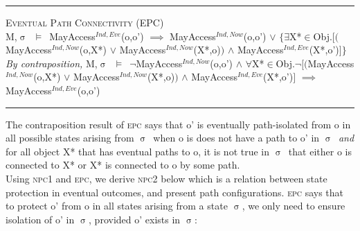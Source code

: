 \documentclass[a4paper,11pt, twoside,twocolumn]{article}
\newenvironment{logic}[1][null]
{\begin{flushleft} \small \label{#1}}
{\end{flushleft}}
\newcommand{\loin}{$\in$}
\newcommand{\loforall}{$\forall$}
\newcommand{\loexists}{$\exists$}
\newcommand{\loand}{$\land$}
\newcommand{\loor} {$\lor$}
\newcommand{\loimplies}{$\implies$}
\newcommand{\losigma}{$\upsigma$}
\newcommand{\loturns} {$\vDash$}
\newcommand{\loneg}{$\neg$}
\newcommand{\ablock} {\null\qquad}
\begin{document}
\begin{logic}
\hrule\null
\textsc{\normalsize *Eventual Path Connectivity (EPC)}\\
M,\losigma\ \loturns\ 
MayAccess$^{Ind,Eve}$(o,o')\linebreak
\ablock \loimplies\linebreak
\ablock MayAccess$^{Ind,Now}$(o,o')\linebreak
\ablock \loor\linebreak
\ablock $\{$\loexists X*\loin Obj.$[($MayAccess$^{Ind,Now}$(o,X*) \loor \linebreak
\ablock \ablock \ablock \ablock MayAccess$^{Ind,Now}$(X*,o)$)$\linebreak
\ablock \ablock \ablock \ablock \loand \linebreak
\ablock \ablock \ablock \ablock MayAccess$^{Ind,Eve}$(X*,o')$]\}$
\linebreak \\
\textit{By contraposition,}\linebreak
M,\losigma\ \loturns\ 
\loneg MayAccess$^{Ind,Now}$(o,o')\linebreak
\ablock \loand\linebreak
\ablock \loforall X*\loin Obj.\loneg$[($MayAccess$^{Ind,Now}$(o,X*) \loor \linebreak
\ablock \ablock \ablock \ablock MayAccess$^{Ind,Now}$(X*,o)$)$\linebreak
\ablock \ablock \ablock \ablock \loand \linebreak
\ablock \ablock \ablock \ablock MayAccess$^{Ind,Eve}$(X*,o')$]$\linebreak
\ablock \loimplies\linebreak
MayAccess$^{Ind,Eve}$(o,o')\
\linebreak
\hrule
\end{logic}
The contraposition result of \textsc{epc} says that o' is eventually path-isolated from o in all possible states arising from \losigma\ when o is does not have a path to o' in \losigma\ \textit{and} for all object X* that has eventual paths to o, it is not true in \losigma\ that either o is connected to X* or X* is connected to o by some path.\\

Using \textsc{npc1} and \textsc{epc}, we derive \textsc{npc2} below which is a relation between state protection in eventual outcomes, and present path configurations. \textsc{epc} says that to protect o' from o in all states arising from a state \losigma, we only need to ensure isolation of o' in \losigma, provided o' exists in \losigma :
\end{document}
